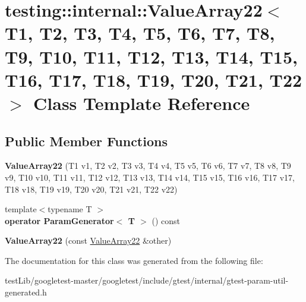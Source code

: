 \hypertarget{classtesting_1_1internal_1_1ValueArray22}{}\section{testing\+:\+:internal\+:\+:Value\+Array22$<$ T1, T2, T3, T4, T5, T6, T7, T8, T9, T10, T11, T12, T13, T14, T15, T16, T17, T18, T19, T20, T21, T22 $>$ Class Template Reference}
\label{classtesting_1_1internal_1_1ValueArray22}
\subsection*{Public Member Functions}
\begin{DoxyCompactItemize}
\item 
\mbox{\label{classtesting_1_1internal_1_1ValueArray22_a65c51cba30994847b9e904edb41dee0e}} 
{\bfseries Value\+Array22} (T1 v1, T2 v2, T3 v3, T4 v4, T5 v5, T6 v6, T7 v7, T8 v8, T9 v9, T10 v10, T11 v11, T12 v12, T13 v13, T14 v14, T15 v15, T16 v16, T17 v17, T18 v18, T19 v19, T20 v20, T21 v21, T22 v22)
\item 
\mbox{\label{classtesting_1_1internal_1_1ValueArray22_aed2e5437d46e87d6de846be6f27ea936}} 
{\footnotesize template$<$typename T $>$ }\\{\bfseries operator Param\+Generator$<$ T $>$} () const
\item 
\mbox{\label{classtesting_1_1internal_1_1ValueArray22_aa1224f9cebb6f87d7ad78ed90b42e77e}} 
{\bfseries Value\+Array22} (const \hyperlink{classtesting_1_1internal_1_1ValueArray22}{Value\+Array22} \&other)
\end{DoxyCompactItemize}


The documentation for this class was generated from the following file\+:\begin{DoxyCompactItemize}
\item 
test\+Lib/googletest-\/master/googletest/include/gtest/internal/gtest-\/param-\/util-\/generated.\+h\end{DoxyCompactItemize}

